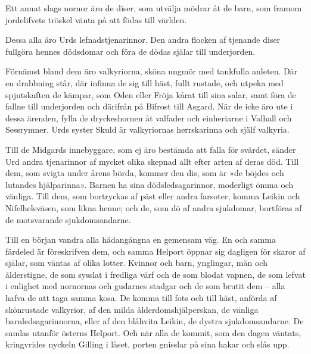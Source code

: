 Ett annat slags nornor äro de diser, som utvälja mödrar åt de barn, som
framom jordelifvets tröskel vänta på att födas till världen.

Dessa alla äro Urds lefnadstjenarinnor. Den andra flocken af tjenande
diser fullgöra hennes dödsdomar och föra de dödas själar till
underjorden.

Förnämst bland dem äro valkyriorna, sköna ungmör med tankfulla anleten.
Där en drabbning står, där infinna de sig till häst, fullt rustade, och
utpeka med spjutskaften de kämpar, som Oden eller Fröja kårat till sina
salar, samt föra de fallne till underjorden och därifrån på Bifrost till
Asgard. När de icke äro ute i dessa ärenden, fylla de dryckeshornen åt
valfader och einheriarne i Valhall och Sessrymner. Urds syster Skuld är
valkyriornas herrskarinna och själf valkyria.

Till de Midgards innebyggare, som ej äro bestämda att falla för svärdet,
sänder Urd andra tjenarinnor af mycket olika skepnad allt efter arten af
deras död. Till dem, som svigta under årens börda, kommer den dis, som
är »de böjdes och lutandes hjälparinna». Barnen ha sina
dödsledsagarinnor, moderligt ömma och vänliga. Till dem, som bortryckas
af päst eller andra farsoter, komma Leikin och Nifelhelsväsen, som likna
henne; och de, som dö af andra sjukdomar, bortföras af de motsvarande
sjukdomsandarne.

Till en början vandra alla hädangångna en gemensam väg. En och samma
färdeled är föreskrifven dem, och samma Helport öppnar sig dagligen för
skaror af själar, som väntas
\protect\hypertarget{lb1625905.xhtmlux5cux23start181}{}{}\protect\hypertarget{lb1625905.xhtmlux5cux23start181-a}{}{}\protect\hypertarget{lb1625905.xhtmlux5cux23start181-b}{}{}\protect\hypertarget{lb1625905.xhtmlux5cux23start181-c}{}{}\protect\hypertarget{lb1625905.xhtmlux5cux23start181-d}{}{}
af olika lotter. Kvinnor och barn, ynglingar, män och ålderstigne, de
som sysslat i fredliga värf och de som blodat vapnen, de som lefvat i
enlighet med nornornas och gudarnes stadgar och de som brutit dem --
alla hafva de att taga samma kosa. De komma till fots och till häst,
anförda af skönrustade valkyrior, af den milda ålderdomshjälperskan, de
vänliga barnledsagarinnorna, eller af den blåhvita Leikin, de dystra
sjukdomsandarne. De samlas utanför österns Helport. Och när alla de
kommit, som den dagen väntats, kringvrides nyckeln Gilling i låset,
porten gnisslar på sina hakar och slås upp.

